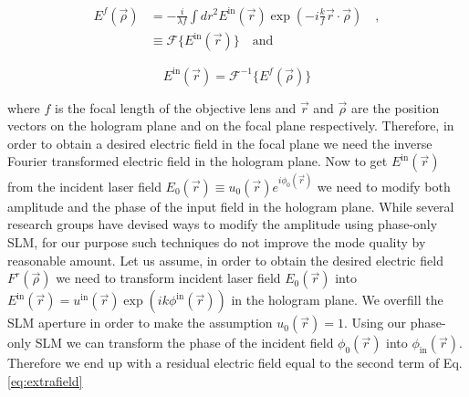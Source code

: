 
\begin{subequations}
\label{eq:fourier_relation}
\begin{align}
        E^{f}(\vec{\rho}) & = -\frac{i}{\lambda f} \int dr^{2} E^{\mathrm{in}}(\vec{r}) \exp \left(-i\frac{k}{f}\vec{r}\cdot \vec{\rho}\right) \quad , \\
 & \equiv \mathcal{F} \lbrace E^{\mathrm{in}}(\vec{r}) \rbrace \quad \mathrm{and}
\end{align}
\end{subequations}

\begin{equation}
\label{eq:inversefourier}
E^{\mathrm{in}}(\vec{r})   = \mathcal{F}^{-1}\lbrace E^{f}(\vec{\rho})\rbrace
\end{equation}

where $f$ is the focal length of the objective lens and $\vec{r}$ and $\vec{\rho}$ are the position vectors on the hologram plane and on the focal plane respectively. Therefore, in order to obtain a desired electric field in the focal plane we need the inverse Fourier transformed electric field in the hologram plane. Now to get $E^{\mathrm{in}}(\vec{r})$ from the incident laser field $E_{0}(\vec{r})\equiv u_{0}(\vec{r})e^{i\phi _{0}(\vec{r})}$ we need to modify both amplitude and the phase of the input field in the hologram plane. While several research groups have devised ways to modify the amplitude \cite{Ando:09, Bagnoud:04, Liu:14, Wilson:07, vanPutten:08, zhu2014} using phase-only SLM, for our purpose such techniques do not improve the mode quality by reasonable amount. Let us assume, in order to obtain the desired electric field $F^{r}(\vec{\rho})$ we need to transform incident laser field $E_{0}(\vec{r})$ into $E^{\mathrm{in}}(\vec{r}) = u^{\mathrm{in}}(\vec{r})\exp (ik\phi ^{\mathrm{in}}(\vec{r}))$ in the hologram plane. We overfill the SLM aperture in order to make the assumption $u_{0}(\vec{r}) = 1$. Using our phase-only SLM we can transform the phase of the incident field $\phi _{0}(\vec{r})$ into $\phi _{\mathrm{in}}(\vec{r})$. Therefore we end up with a residual electric field equal to the second term of Eq.\eqref{eq:extrafield}

